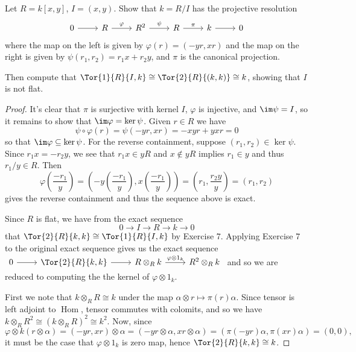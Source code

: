 \documentclass[10pt]{amsart}
\begin{document}
\begin{ex}
  Let $R = k[x,y]$, $I = (x,y)$.
  Show that $k = R/I$ has the projective resolution
  $$\begin{tikzcd}
    0 \arrow{r}& R \arrow{r}{\varphi}& R^2 \arrow{r}{\psi}& R \arrow{r}{\pi} & k \arrow{r} & 0
  \end{tikzcd}$$
  where the map on the left is given by $\varphi(r) = (-yr, xr)$ and the map on the right is given by $\psi(r_1, r_2) = r_1x + r_2y$, and $\pi$ is the canonical projection.

  Then compute that $\Tor{1}{R}{I,k} \cong \Tor{2}{R}{(k,k)} \cong k$, showing that $I$ is not flat.

  \begin{proof}
    It's clear that $\pi$ is surjective with kernel $I$, $\varphi$ is injective, and $\im\psi = I$, so it remains to show that $\im\varphi = \ker\psi$.
    Given $r \in R$ we have
    $$\psi \circ \varphi(r) = \psi(-yr, xr) = -xyr + yxr = 0$$
    so that $\im\varphi \subseteq \ker\psi$.
    For the reverse containment, suppose $(r_1, r_2) \in \ker\psi$.
    Since $r_1x = -r_2y$, we see that $r_1x \in yR$ and $x \not \in yR$ implies $r_1 \in y$ and thus $r_1/y \in R$.
    Then
    $$\varphi\left(\frac{-r_1}{y}\right) = \left(-y\left(\frac{-r_1}{y}\right), x\left(\frac{-r_1}{y}\right)\right) = \left(r_1, \frac{r_2y}{y} \right) = \left(r_1, r_2\right)$$
    gives the reverse containment and thus the sequence above is exact.

    Since $R$ is flat, we have from the exact sequence
    $$0 \rightarrow I \rightarrow R \rightarrow k \rightarrow 0$$
    that $\Tor{2}{R}{k,k} \cong \Tor{1}{R}{I,k}$ by Exercise 7.
    Applying Exercise 7 to the original exact sequence gives us the exact sequence $\begin{tikzcd} 0 \arrow{r} & \Tor{2}{R}{k,k} \arrow{r} & R \otimes_R k \arrow{r}{\varphi \otimes 1_k} & R^2 \otimes_R k\end{tikzcd}$ and so we are reduced to computing the the kernel of $\varphi \otimes 1_k$.

      First we note that $k \otimes_R R \cong k$ under the map $\alpha \otimes r \mapsto \pi(r)\alpha$.
      Since tensor is left adjoint to $\operatorname{Hom}$, tensor commutes with colomits, and so we have $k \otimes_R R^2 \cong (k \otimes_R R)^2 \cong k^2$.
      Now, since $$\varphi \otimes k(r \otimes \alpha) = (-yr, xr) \otimes \alpha = (-yr \otimes \alpha, xr \otimes \alpha) = (\pi(-yr)\alpha, \pi(xr)\alpha) = (0,0),$$
      it must be the case that $\varphi \otimes 1_k$ is zero map, hence $\Tor{2}{R}{k,k} \cong k$.
  \end{proof}
\end{ex}
\end{document}
